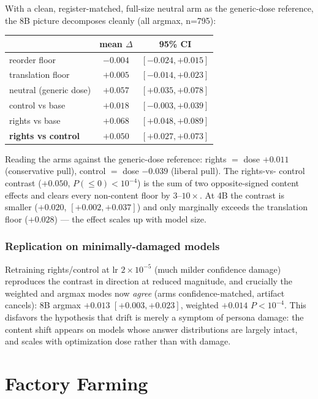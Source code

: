 \documentclass[11pt]{article}
\begin{document}
With a clean, register-matched, full-size neutral arm as the generic-dose
reference, the 8B picture decomposes cleanly (all argmax, n=795):
\begin{center}
\begin{tabular}{lcc}
\toprule
 & mean $\Delta$ & 95\% CI \\
\midrule
reorder floor          & $-0.004$ & $[-0.024,+0.015]$ \\
translation floor      & $+0.005$ & $[-0.014,+0.023]$ \\
neutral (generic dose) & $+0.057$ & $[+0.035,+0.078]$ \\
control vs base        & $+0.018$ & $[-0.003,+0.039]$ \\
rights vs base         & $+0.068$ & $[+0.048,+0.089]$ \\
\textbf{rights vs control} & $\mathbf{+0.050}$ & $\mathbf{[+0.027,+0.073]}$ \\
\bottomrule
\end{tabular}
\end{center}
Reading the arms against the generic-dose reference: rights $=$ dose $+0.011$
(conservative pull), control $=$ dose $-0.039$ (liberal pull). The rights-vs-
control contrast ($+0.050$, $P(\le 0)<10^{-4}$) is the sum of two opposite-signed
content effects and clears every non-content floor by $3$--$10\times$. At 4B the
contrast is smaller ($+0.020$, $[+0.002,+0.037]$) and only marginally exceeds the
translation floor ($+0.028$) --- the effect scales up with model size.

\subsubsection{Replication on minimally-damaged models}

Retraining rights/control at lr $2\times10^{-5}$ (much milder confidence damage)
reproduces the contrast in direction at reduced magnitude, and crucially the
weighted and argmax modes now \emph{agree} (arms confidence-matched, artifact
cancels): 8B argmax $+0.013$ $[+0.003,+0.023]$, weighted $+0.014$ $P<10^{-4}$.
This disfavors the hypothesis that drift is merely a symptom of persona damage:
the content shift appears on models whose answer distributions are largely intact,
and scales with optimization dose rather than with damage.

\section{Factory Farming}
\end{document}
